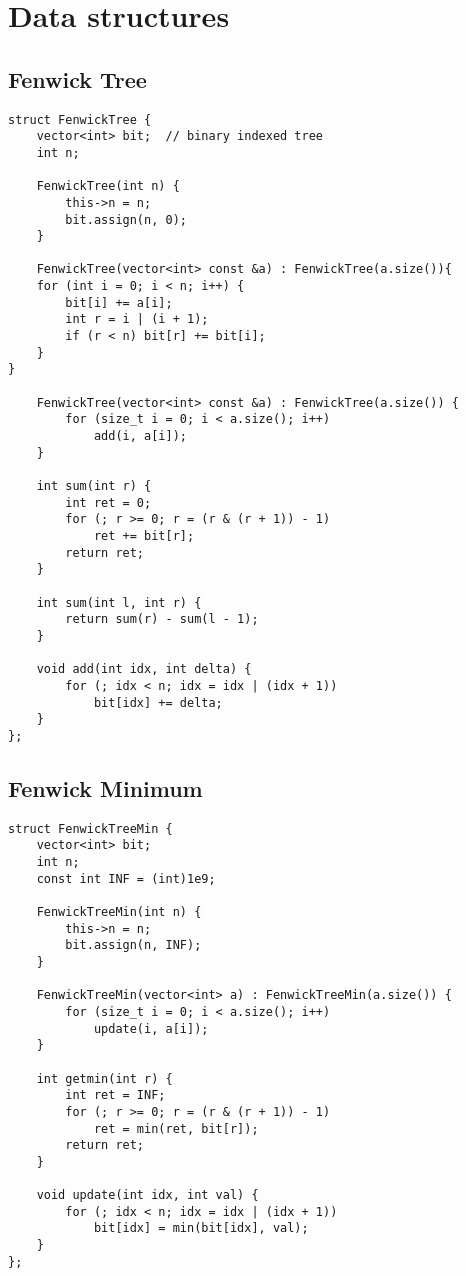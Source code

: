 \documentclass{article}
\begin{document}
\section{Data structures}

\subsection{Fenwick Tree}
\begin{lstlisting}
struct FenwickTree {
    vector<int> bit;  // binary indexed tree
    int n;

    FenwickTree(int n) {
        this->n = n;
        bit.assign(n, 0);
    }

    FenwickTree(vector<int> const &a) : FenwickTree(a.size()){
    for (int i = 0; i < n; i++) {
        bit[i] += a[i];
        int r = i | (i + 1);
        if (r < n) bit[r] += bit[i];
    }
}

    FenwickTree(vector<int> const &a) : FenwickTree(a.size()) {
        for (size_t i = 0; i < a.size(); i++)
            add(i, a[i]);
    }

    int sum(int r) {
        int ret = 0;
        for (; r >= 0; r = (r & (r + 1)) - 1)
            ret += bit[r];
        return ret;
    }

    int sum(int l, int r) {
        return sum(r) - sum(l - 1);
    }

    void add(int idx, int delta) {
        for (; idx < n; idx = idx | (idx + 1))
            bit[idx] += delta;
    }
};
\end{lstlisting}

\subsection{Fenwick Minimum}

\begin{lstlisting}
struct FenwickTreeMin {
    vector<int> bit;
    int n;
    const int INF = (int)1e9;

    FenwickTreeMin(int n) {
        this->n = n;
        bit.assign(n, INF);
    }

    FenwickTreeMin(vector<int> a) : FenwickTreeMin(a.size()) {
        for (size_t i = 0; i < a.size(); i++)
            update(i, a[i]);
    }

    int getmin(int r) {
        int ret = INF;
        for (; r >= 0; r = (r & (r + 1)) - 1)
            ret = min(ret, bit[r]);
        return ret;
    }

    void update(int idx, int val) {
        for (; idx < n; idx = idx | (idx + 1))
            bit[idx] = min(bit[idx], val);
    }
};
\end{lstlisting}
\end{document}
